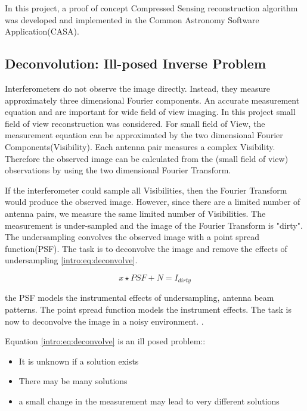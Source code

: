 In this project, a proof of concept Compressed Sensing reconstruction algorithm was developed and implemented in the Common Astronomy Software Application(CASA). 


\subsection{Deconvolution: Ill-posed Inverse Problem}
Interferometers do not observe the image directly. Instead, they measure approximately three dimensional Fourier components. An accurate measurement equation and are important for wide field of view imaging. In this project small field of view reconstruction was considered. For small field of View, the measurement equation can be approximated by the two dimensional Fourier Components(Visibility). Each antenna pair measures a complex Visibility. Therefore the observed image can be calculated from the (small field of view) observations by using the two dimensional Fourier Transform.

If the interferometer could sample all Visibilities, then the Fourier Transform would produce the observed image. However, since there are a limited number of antenna pairs, we  measure the same limited number of Visibilities. The measurement is under-sampled and the image of the Fourier Transform is "dirty". The undersampling convolves the observed image with a point spread function(PSF). The task is to deconvolve the image and remove the effects of undersampling \eqref{intro:eq:deconvolve}.

\begin{equation}\label{intro:eq:deconvolve}
x \star  PSF + N = I_{dirty} 
\end{equation}

the PSF models the instrumental effects of undersampling, antenna beam patterns.
The point spread function models the instrument effects. The task is now to deconvolve the image in a noisy environment.  .

Equation \eqref{intro:eq:deconvolve} is an ill posed problem::
\begin{itemize}
	\item It is unknown if a solution exists
	\item There may be many solutions
	\item a small change in the measurement may lead to very different solutions 
\end{itemize}

